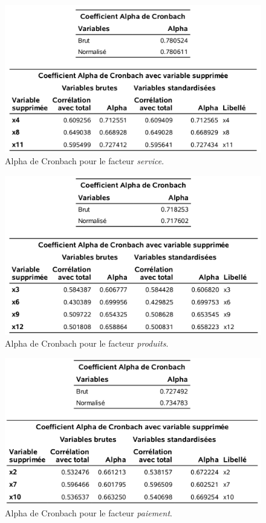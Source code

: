 \documentclass[
  11pt,
  letterpaper,
]{book}
\theoremstyle{definition}
\theoremstyle{definition}
\theoremstyle{definition}
\theoremstyle{remark}
\begin{document}
\begin{figure}

{\centering \includegraphics[width=0.85\linewidth]{figures/01-facto-e8} 

}

\caption{Alpha de Cronbach pour le facteur \emph{service}.}\label{fig:fig1p8}
\end{figure}

\begin{figure}

{\centering \includegraphics[width=0.85\linewidth]{figures/01-facto-e9} 

}

\caption{Alpha de Cronbach pour le facteur \emph{produits}.}\label{fig:fig1p9}
\end{figure}

\begin{figure}

{\centering \includegraphics[width=0.85\linewidth]{figures/01-facto-e10} 

}

\caption{Alpha de Cronbach pour le facteur \emph{paiement}.}\label{fig:fig1p10}
\end{figure}
\end{document}
